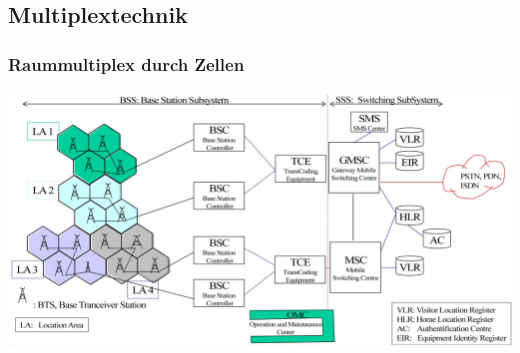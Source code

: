 \subsection{Multiplextechnik}
\subsubsection{Raummultiplex durch Zellen}
\includegraphics[width = \linewidth]{./Pics/GSMZellen}

